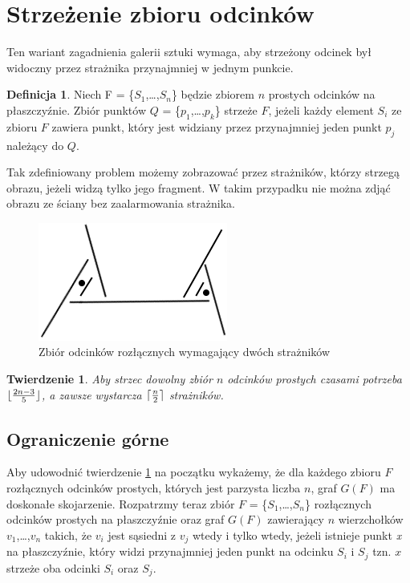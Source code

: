 \documentclass[brudnopis]{xmgr}
\DeclarePairedDelimiter\ceil{\lceil}{\rceil}
\DeclarePairedDelimiter\floor{\lfloor}{\rfloor}
\newtheorem{Twierdzenie}{Twierdzenie} \theoremstyle{definition}
\newtheorem{Definicja}{Definicja} \theoremstyle{definition}
\begin{document}
\section{Strzeżenie zbioru odcinków}
Ten wariant zagadnienia galerii sztuki wymaga, aby strzeżony odcinek był widoczny przez strażnika przynajmniej w jednym punkcie. 
\begin{Definicja}
Niech F = \textnormal{\{}$S_1$,\ldots,$S_n$\textnormal{\}} będzie zbiorem $n$ prostych \textnormal{odcinków} na płaszczyźnie. Zbiór punktów $Q$ = \textnormal{\{}$p_1$,\ldots,$p_k$\textnormal{\}} \textnormal{strzeże} $F$, jeżeli każdy element $S_i$ ze zbioru $F$ zawiera punkt, który jest widziany przez przynajmniej jeden punkt $p_j$ należący do $Q$.
\end{Definicja}
Tak zdefiniowany problem możemy zobrazować przez strażników, którzy strzegą obrazu, jeżeli widzą tylko jego fragment. W takim przypadku nie można zdjąć obrazu ze ściany bez zaalarmowania strażnika.
\begin{figure}[ht!]
 \centering
  \includegraphics{rysunki/rozlaczny_dwoch_straznikow.png}
  \caption{Zbiór odcinków rozłącznych wymagający dwóch strażników}
\end{figure} 

\begin{Twierdzenie}\label{straznicy strzezenie}
Aby \textnormal{strzec} dowolny zbiór $n$ \textnormal{odcinków} prostych czasami potrzeba $\floor{\frac{2n-3}{5}}$, a zawsze wystarcza $\ceil{\frac{n}{2}}$ strażników.
\end{Twierdzenie}

\subsection{Ograniczenie górne}
Aby udowodnić twierdzenie \ref{straznicy strzezenie} na początku wykażemy, że dla każdego zbioru $F$ rozłącznych odcinków prostych, których jest parzysta liczba $n$, graf $G(F)$ ma doskonałe skojarzenie.
Rozpatrzmy teraz zbiór $F$ = \textnormal{\{}$S_1$,\ldots,$S_n$\textnormal{\}} rozłącznych odcinków prostych na płaszczyźnie oraz graf $G(F)$ zawierający $n$ wierzchołków $v_1$,\ldots,$v_n$ takich, że $v_i$ jest sąsiedni z $v_j$ wtedy i tylko wtedy, jeżeli istnieje punkt \textit{x} na płaszczyźnie, który widzi przynajmniej jeden punkt na odcinku $S_i$ i $S_j$ tzn. $x$ strzeże oba odcinki $S_i$ oraz $S_j$.
\end{document}
